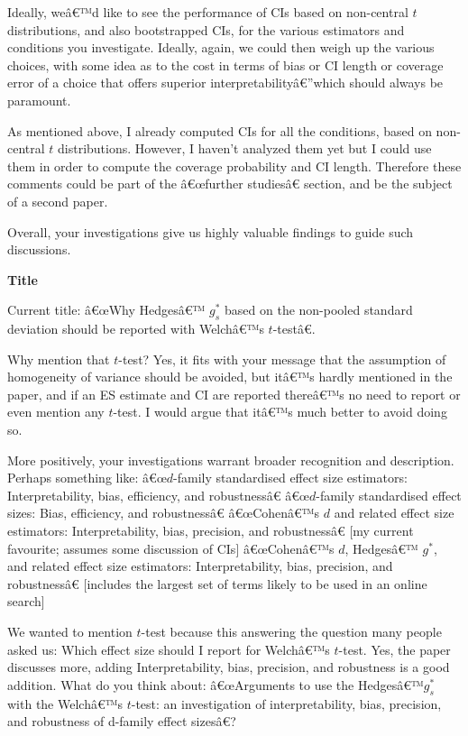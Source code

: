 \begin{appendix}
Ideally, weâ€™d like to see the performance of CIs based on non-central
\(t\) distributions, and also bootstrapped CIs, for the various
estimators and conditions you investigate. Ideally, again, we could then
weigh up the various choices, with some idea as to the cost in terms of
bias or CI length or coverage error of a choice that offers superior
interpretabilityâ€''which should always be paramount.

\color{blue} As mentioned above, I already computed CIs for all the
conditions, based on non-central \(t\) distributions. However, I haven't
analyzed them yet but I could use them in order to compute the coverage
probability and CI length. Therefore these comments could be part of the
â€œfurther studiesâ€ section, and be the subject of a second paper.

\color{black} Overall, your investigations give us highly valuable
findings to guide such discussions.

\textbf{Title}

Current title: â€œWhy Hedgesâ€™ \(g_s^*\) based on the non-pooled
standard deviation should be reported with Welchâ€™s \(t\)-testâ€.

Why mention that \(t\)-test? Yes, it fits with your message that the
assumption of homogeneity of variance should be avoided, but itâ€™s
hardly mentioned in the paper, and if an ES estimate and CI are reported
thereâ€™s no need to report or even mention any \(t\)-test. I would
argue that itâ€™s much better to avoid doing so.

More positively, your investigations warrant broader recognition and
description. Perhaps something like: â€œ\(d\)-family standardised effect
size estimators: Interpretability, bias, efficiency, and robustnessâ€
â€œ\(d\)-family standardised effect sizes: Bias, efficiency, and
robustnessâ€ â€œCohenâ€™s \(d\) and related effect size estimators:
Interpretability, bias, precision, and robustnessâ€ {[}my current
favourite; assumes some discussion of CIs{]} â€œCohenâ€™s \(d\),
Hedgesâ€™ \(g^*\), and related effect size estimators: Interpretability,
bias, precision, and robustnessâ€ {[}includes the largest set of terms
likely to be used in an online search{]}

\color{blue} We wanted to mention \(t\)-test because this answering the
question many people asked us: Which effect size should I report for
Welchâ€™s \(t\)-test. Yes, the paper discusses more, adding
Interpretability, bias, precision, and robustness is a good addition.
What do you think about: â€œArguments to use the Hedgesâ€™\(g_s^*\) with
the Welchâ€™s \(t\)-test: an investigation of interpretability, bias,
precision, and robustness of d-family effect sizesâ€?


\end{appendix}
